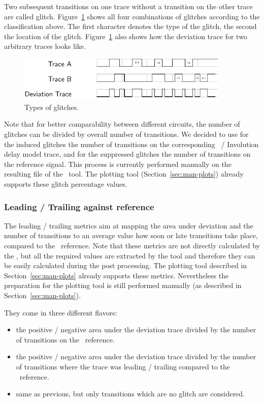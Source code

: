 Two subsequent transitions on one trace without a transition on the other trace 
are called glitch. Figure~\ref{fig:man-inv_tool_glitches} shows all four 
combinations of glitches according to the classification above. The first 
character denotes the type of the glitch, the second the location of the glitch.
Figure~\ref{fig:man-inv_tool_glitches} also shows how the deviation trace for 
two arbitrary traces looks like.

\begin{figure}[!ht]
	\centering
	\includegraphics[width=0.9\textwidth]{figures/glitches.pdf}
	\caption{Types of glitches.}
	\label{fig:man-inv_tool_glitches}
\end{figure}

Note that for better comparability between different circuits, the number of 
glitches can be divided by overall number of transitions. 
We decided to use for the induced glitches the number of transitions on the 
corresponding \modelsim\ / Involution delay model trace, and for the suppressed 
glitches the number of transitions on the reference signal. 
This process is currently performed manually on the resulting 
 file of the \multiexec\ tool. 
The plotting tool (Section~\ref{sec:man-plots}) already supports these glitch 
percentage values.

\subsubsection{Leading / Trailing against reference}

The leading / trailing metrics aim at mapping the area under deviation and the 
number of transitions to an average value how soon or late transitions take 
place, compared to the \spice\ reference. Note that these metrics are not 
directly calculated by the \invt, but all the required values are extracted by 
the tool and therefore they can be easily calculated during the post 
processing. The plotting tool described in Section~\ref{sec:man-plots} already 
supports these metrics. Nevertheless the preparation for the plotting tool is 
still performed manually (as described in Section~\ref{sec:man-plots}).

They come in three different flavors:
\begin{itemize}
 	\item the positive / negative area under the deviation trace divided by the 
 	number of transitions on the \spice\ reference.
 	\item the positive / negative area under the deviation trace  divided by 
 	the number of transitions where the trace was leading / trailing compared 
 	to the \spice\ reference.
 	\item same as previous, but only transitions which are no glitch are 
 	considered.
\end{itemize}

